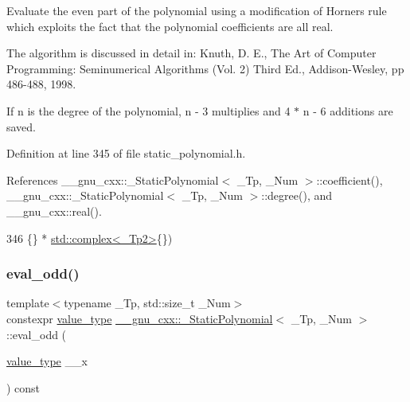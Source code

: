 Evaluate the even part of the polynomial using a modification of Horner\textquotesingle{}s rule which exploits the fact that the polynomial coefficients are all real.

The algorithm is discussed in detail in\+: Knuth, D. E., The Art of Computer Programming\+: Seminumerical Algorithms (Vol. 2) Third Ed., Addison-\/\+Wesley, pp 486-\/488, 1998.

If n is the degree of the polynomial, n -\/ 3 multiplies and 4 $\ast$ n -\/ 6 additions are saved. 

Definition at line 345 of file static\+\_\+polynomial.\+h.



References \+\_\+\+\_\+gnu\+\_\+cxx\+::\+\_\+\+Static\+Polynomial$<$ \+\_\+\+Tp, \+\_\+\+Num $>$\+::coefficient(), \+\_\+\+\_\+gnu\+\_\+cxx\+::\+\_\+\+Static\+Polynomial$<$ \+\_\+\+Tp, \+\_\+\+Num $>$\+::degree(), and \+\_\+\+\_\+gnu\+\_\+cxx\+::real().


\begin{DoxyCode}
346                               \{\} * \hyperlink{classstd_1_1complex}{std::complex<\_Tp2>}\{\})
\end{DoxyCode}
\mbox{\label{class____gnu__cxx_1_1__StaticPolynomial_ab8249741ad67288e9fc8d256df3e3e90}} 
\subsubsection{\texorpdfstring{eval\+\_\+odd()}{eval\_odd()}\hspace{0.1cm}{\footnotesize\ttfamily [1/2]}}
{\footnotesize\ttfamily template$<$typename \+\_\+\+Tp, std\+::size\+\_\+t \+\_\+\+Num$>$ \\
constexpr \hyperlink{class____gnu__cxx_1_1__StaticPolynomial_af23110f5a002cd6caa3542df7cf35284}{value\+\_\+type} \hyperlink{class____gnu__cxx_1_1__StaticPolynomial}{\+\_\+\+\_\+gnu\+\_\+cxx\+::\+\_\+\+Static\+Polynomial}$<$ \+\_\+\+Tp, \+\_\+\+Num $>$\+::eval\+\_\+odd (\begin{DoxyParamCaption}\item[{\hyperlink{class____gnu__cxx_1_1__StaticPolynomial_af23110f5a002cd6caa3542df7cf35284}{value\+\_\+type}}]{\+\_\+\+\_\+x }\end{DoxyParamCaption}) const\hspace{0.3cm}{\ttfamily [inline]}}

